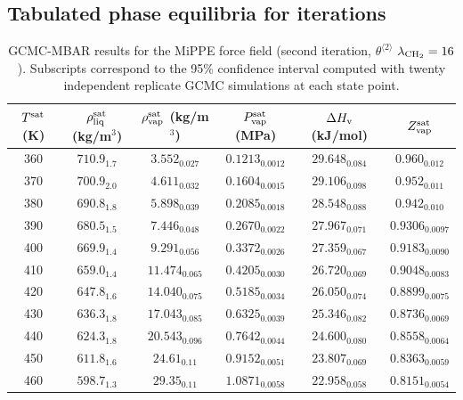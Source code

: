 \documentclass[journal=jctc,manuscript=article]{achemso}
\begin{document}
\newpage
\clearpage

\subsection{Tabulated phase equilibria for iterations}

	\begin{table}[htb!]
		\caption{GCMC-MBAR results for the MiPPE force field (second iteration, $\theta^{\langle2\rangle}$ $\lambda_{\rm CH_2} = 16$). Subscripts correspond to the 95\% confidence interval computed with twenty independent replicate GCMC simulations at each state point.}
		\begin{center}
			\begin{tabular}{|c|c|c|c|c|c|}
				\hline
				$T^{\rm sat}$ (K) & $\rho_{\rm liq}^{\rm sat}$ (kg/m$^3$) & $\rho_{\rm vap}^{\rm sat}$ (kg/m$^3$) & $P_{\rm vap}^{\rm sat}$ (MPa) & $\Delta H_{\rm v}$ (kJ/mol) & $Z_{\rm vap}^{\rm sat}$ \\ \hline
				360 & $710.9_{1.7}$ & $3.552_{0.027}$ & $0.1213_{0.0012}$ & $29.648_{0.084}$ & $0.960_{0.012}$ \\
				370 & $700.9_{2.0}$ & $4.611_{0.032}$ & $0.1604_{0.0015}$ & $29.106_{0.098}$ & $0.952_{0.011}$ \\
				380 & $690.8_{1.8}$ & $5.898_{0.039}$ & $0.2085_{0.0018}$ & $28.548_{0.088}$ & $0.942_{0.010}$ \\
				390 & $680.5_{1.5}$ & $7.446_{0.048}$ & $0.2670_{0.0022}$ & $27.967_{0.071}$ & $0.9306_{0.0097}$ \\
				400 & $669.9_{1.4}$ & $9.291_{0.056}$ & $0.3372_{0.0026}$ & $27.359_{0.067}$ & $0.9183_{0.0090}$ \\
				410 & $659.0_{1.4}$ & $11.474_{0.065}$ & $0.4205_{0.0030}$ & $26.720_{0.069}$ & $0.9048_{0.0083}$ \\
				420 & $647.8_{1.6}$ & $14.040_{0.075}$ & $0.5185_{0.0034}$ & $26.050_{0.074}$ & $0.8899_{0.0075}$ \\
				430 & $636.3_{1.8}$ & $17.043_{0.085}$ & $0.6325_{0.0039}$ & $25.346_{0.082}$ & $0.8736_{0.0069}$ \\
				440 & $624.3_{1.8}$ & $20.543_{0.096}$ & $0.7642_{0.0044}$ & $24.600_{0.080}$ & $0.8558_{0.0064}$ \\
				450 & $611.8_{1.6}$ & $24.61_{0.11}$ & $0.9152_{0.0051}$ & $23.807_{0.069}$ & $0.8363_{0.0059}$ \\
				460 & $598.7_{1.3}$ & $29.35_{0.11}$ & $1.0871_{0.0058}$ & $22.958_{0.058}$ & $0.8151_{0.0054}$ \\

\end{tabular}
\end{center}
\end{table}
\end{document}
